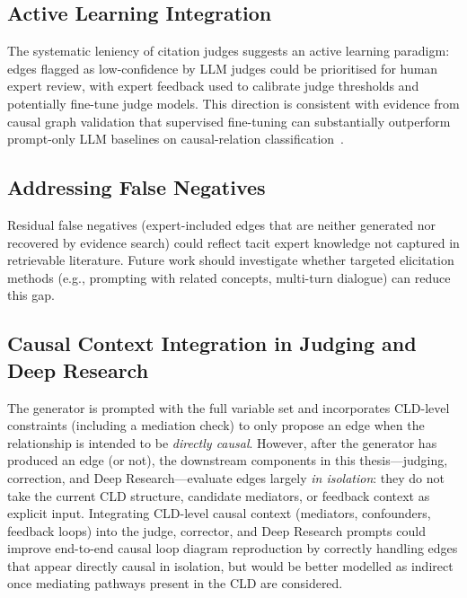 \subsection{Active Learning Integration}

The systematic leniency of citation judges suggests an active learning paradigm: edges flagged as low-confidence by LLM judges could be prioritised for human expert review, with expert feedback used to calibrate judge thresholds and potentially fine-tune judge models. This direction is consistent with evidence from causal graph validation that supervised fine-tuning can substantially outperform prompt-only LLM baselines on causal-relation classification~\citep{susanti2024prompting}.

\subsection{Addressing False Negatives}

Residual false negatives (expert-included edges that are neither generated nor recovered by evidence search) could reflect tacit expert knowledge not captured in retrievable literature. Future work should investigate whether targeted elicitation methods (e.g., prompting with related concepts, multi-turn dialogue) can reduce this gap.

\subsection{Causal Context Integration in Judging and Deep Research}

The generator is prompted with the full variable set and incorporates CLD-level constraints (including a mediation check) to only propose an edge when the relationship is intended to be \textit{directly causal}. However, after the generator has produced an edge (or not), the downstream components in this thesis---judging, correction, and Deep Research---evaluate edges largely \textit{in isolation}: they do not take the current CLD structure, candidate mediators, or feedback context as explicit input. Integrating CLD-level causal context (mediators, confounders, feedback loops) into the judge, corrector, and Deep Research prompts could improve end-to-end causal loop diagram reproduction by correctly handling edges that appear directly causal in isolation, but would be better modelled as indirect once mediating pathways present in the CLD are considered.

